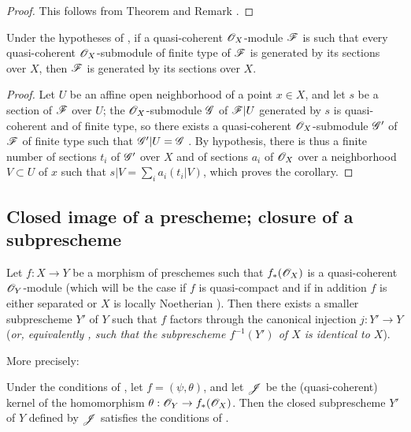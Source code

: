 \begin{proof}
\label{proof-1.9.4.9}
This follows from Theorem  and Remark .
\end{proof}

\begin{cor}[9.4.10]
\label{1.9.4.10}
Under the hypotheses of , if a quasi-coherent $\mathscr{O}_X$-module $\mathscr{F}$ is
such that every quasi-coherent $\mathscr{O}_X$-submodule of finite type of $\mathscr{F}$ is generated by
its sections over $X$, then $\mathscr{F}$ is generated by its sections over $X$.
\end{cor}

\begin{proof}
\label{proof-1.9.4.10}
Let $U$ be an affine open neighborhood of a point $x\in X$, and let $s$ be a
section of $\mathscr{F}$ over $U$; the $\mathscr{O}_X$-submodule $\mathscr{G}$ of $\mathscr{F}|U$ generated by $s$
is quasi-coherent and of finite type, so there exists a quasi-coherent $\mathscr{O}_X$-submodule
$\mathscr{G}'$ of $\mathscr{F}$ of finite type such that $\mathscr{G}'|U=\mathscr{G}$ . By
hypothesis, there is thus a finite number of sections $t_i$ of $\mathscr{G}'$ over $X$ and of
sections $a_i$ of $\mathscr{O}_X$ over a neighborhood $V\subset U$ of $x$ such that
$s|V=\sum_i a_i(t_i|V)$, which proves the corollary.
\end{proof}

\subsection{Closed image of a prescheme; closure of a subprescheme}
\label{subsection-closed-image-and-closure}

\begin{prop}[9.5.1]
\label{1.9.5.1}
Let $f:X\to Y$ be a morphism of preschemes such that $f_*(\mathscr{O}_X)$ is a quasi-coherent
$\mathscr{O}_Y$-module (which will be the case if $f$ is quasi-compact and if in addition $f$ is
either separated or $X$ is locally Noetherian ). Then there exists a smaller
subprescheme $Y'$ of $Y$ such that $f$ factors through the canonical injection $j:Y'\to Y$
(\emph{or, equivalently , such that the subprescheme $f^{-1}(Y')$ of $X$ is
\emph{identical} to $X$}).
\end{prop}

More precisely:
\begin{cor}[9.5.2]
\label{1.9.5.2}
Under the conditions of , let $f=(\psi,\theta)$, and let $\mathscr{J}$ be the
(quasi-coherent) kernel of the homomorphism $\theta:\OO_Y\to f_*(\OO_X)$. Then the closed
subprescheme $Y'$ of $Y$ defined by $\mathscr{J}$ satisfies the conditions of .
\end{cor}

